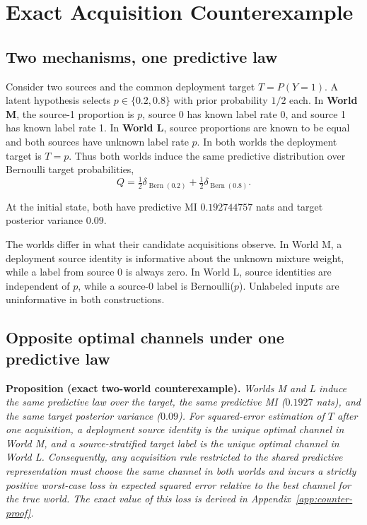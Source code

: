 \documentclass[11pt]{article}
\begin{document}
\section{Exact Acquisition Counterexample}
\label{sec:counter}

\subsection{Two mechanisms, one predictive law}

Consider two sources and the common deployment target $T=P(Y=1)$. A latent hypothesis selects $p\in\{0.2,0.8\}$ with prior probability $1/2$ each. In \textbf{World M}, the source-1 proportion is $p$, source 0 has known label rate 0, and source 1 has known label rate 1. In \textbf{World L}, source proportions are known to be equal and both sources have unknown label rate $p$. In both worlds the deployment target is $T=p$. Thus both worlds induce the same predictive distribution over Bernoulli target probabilities,
\begin{equation}
 Q=\tfrac12\delta_{\operatorname{Bern}(0.2)}+\tfrac12\delta_{\operatorname{Bern}(0.8)}.
\end{equation}

At the initial state, both have predictive MI $0.192744757$ nats and target posterior variance $0.09$.

The worlds differ in what their candidate acquisitions observe. In World M, a deployment source identity is informative about the unknown mixture weight, while a label from source 0 is always zero. In World L, source identities are independent of $p$, while a source-0 label is Bernoulli($p$). Unlabeled inputs are uninformative in both constructions.

\subsection{Opposite optimal channels under one predictive law}

\textbf{Proposition (exact two-world counterexample).} \emph{Worlds M and L induce the same predictive law over the target, the same predictive MI ($0.1927$ nats), and the same target posterior variance ($0.09$). For squared-error estimation of $T$ after one acquisition, a deployment source identity is the unique optimal channel in World M, and a source-stratified target label is the unique optimal channel in World L. Consequently, any acquisition rule restricted to the shared predictive representation must choose the same channel in both worlds and incurs a strictly positive worst-case loss in expected squared error relative to the best channel for the true world. The exact value of this loss is derived in Appendix~\ref{app:counter-proof}.}
\end{document}
